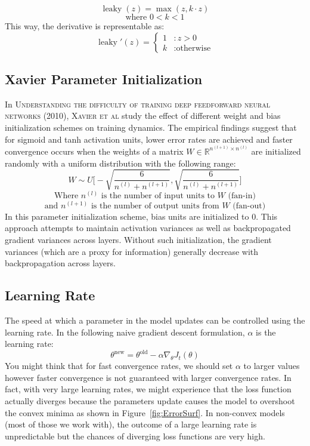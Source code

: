 \documentclass{tufte-handout}
\begin{document}
$$\operatorname{leaky}(z) = \operatorname{max}(z, k\cdot z)$$
$$\text{where } 0<k<1$$
This way, the derivative is representable as:
\begin{displaymath}
    \operatorname{leaky}'(z) = \left\{
     \begin{array}{cl}
       1 & : z > 0\\
       k & : \text{otherwise}
     \end{array}
   \right.
\end{displaymath} 

\subsection{Xavier Parameter Initialization}

In \textsc{Understanding the difficulty of training deep feedforward neural networks (2010), Xavier et al} study the effect of different weight and bias initialization schemes on training dynamics. The empirical findings suggest that for sigmoid and tanh activation units, lower error rates are achieved and faster convergence occurs when the weights of a matrix $W \in \mathbb{R}^{n^{(l+1)}\times n^{(l)}}$ are initialized randomly with a uniform distribution with the following range:
$$W \sim U\bigg[-\sqrt{\frac{6}{n^{(l)} + n^{(l+1)}}}, \sqrt{\frac{6}{n^{(l)} + n^{(l+1)}}}\bigg]$$
$$\text{Where } n^{(l)} \text{ is the number of input units to $W$ (fan-in)}$$
$$\text{and } n^{(l+1)} \text{ is the number of output units from $W$ (fan-out)}$$
In this parameter initialization scheme, bias units are initialized to $0$. This approach attempts to maintain activation variances as well as backpropagated gradient variances across layers. Without such initialization, the gradient variances (which are a proxy for information) generally decrease with backpropagation across layers.
\subsection{Learning Rate}
The speed at which a parameter in the model updates can be controlled using the learning rate. In the following naive gradient descent formulation, $\alpha$ is the learning rate:
$$ \theta^{\text{new}} = \theta^{\text{old}} - \alpha \nabla_{\theta}J_t(\theta)$$
You might think that for fast convergence rates, we should set $\alpha$ to larger values however faster convergence is not guaranteed with larger convergence rates. In fact, with very large learning rates, we might experience that the loss function actually diverges because the parameters update causes the model to overshoot the convex minima as shown in Figure~\ref{fig:ErrorSurf}. In non-convex models (most of those we work with), the outcome of a large learning rate is unpredictable but the chances of diverging loss functions are very high.
\end{document}

